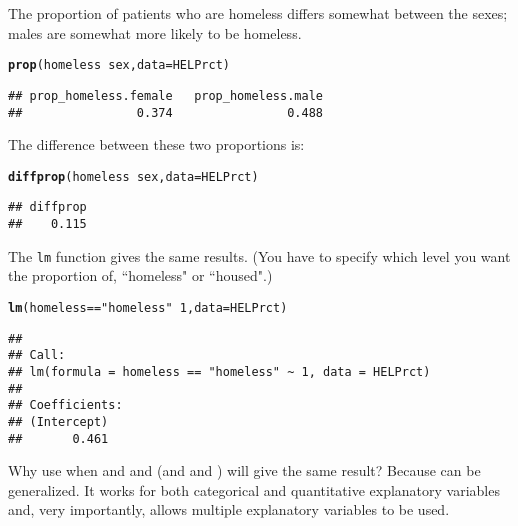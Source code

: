 \documentclass[11pt]{article}\usepackage[]{graphicx}\usepackage[]{color}
\makeatletter
\newcommand{\hlnum}[1]{\textcolor[rgb]{0.686,0.059,0.569}{#1}}%
\newcommand{\hlstr}[1]{\textcolor[rgb]{0.192,0.494,0.8}{#1}}%
\newcommand{\hlopt}[1]{\textcolor[rgb]{0,0,0}{#1}}%
\newcommand{\hlstd}[1]{\textcolor[rgb]{0.345,0.345,0.345}{#1}}%
\newcommand{\hlkwc}[1]{\textcolor[rgb]{0.333,0.667,0.333}{#1}}%
\newcommand{\hlkwd}[1]{\textcolor[rgb]{0.737,0.353,0.396}{\textbf{#1}}}%
\newenvironment{kframe}{%
 \def\at@end@of@kframe{}%
 \ifinner\ifhmode%
  \def\at@end@of@kframe{\end{minipage}}%
  \begin{minipage}{\columnwidth}%
 \fi\fi%
 \def\FrameCommand##1{\hskip\@totalleftmargin \hskip-\fboxsep
 \colorbox{shadecolor}{##1}\hskip-\fboxsep
     \hskip-\linewidth \hskip-\@totalleftmargin \hskip\columnwidth}%
 \MakeFramed {\advance\hsize-\width
   \@totalleftmargin\z@ \linewidth\hsize
   \@setminipage}}%
 {\par\unskip\endMakeFramed%
 \at@end@of@kframe}
\newenvironment{knitrout}{}{} %
\makeatother
\begin{document}
The proportion of patients who are homeless differs somewhat between the sexes; males are somewhat more likely to be homeless.
\begin{knitrout}
\color{fgcolor}\begin{kframe}
\begin{alltt}
\hlkwd{prop}\hlstd{(homeless} \hlopt{~} \hlstd{sex,} \hlkwc{data} \hlstd{= HELPrct)}
\end{alltt}
\begin{verbatim}
## prop_homeless.female   prop_homeless.male 
##                0.374                0.488
\end{verbatim}
\end{kframe}
\end{knitrout}

The difference between these two proportions is:
\begin{knitrout}
\color{fgcolor}\begin{kframe}
\begin{alltt}
\hlkwd{diffprop}\hlstd{(homeless} \hlopt{~} \hlstd{sex,} \hlkwc{data} \hlstd{= HELPrct)}
\end{alltt}
\begin{verbatim}
## diffprop 
##    0.115
\end{verbatim}
\end{kframe}
\end{knitrout}

The \texttt{lm} function gives the same results. (You have to specify which level you want the proportion of, ``homeless" or ``housed".)
\begin{knitrout}
\color{fgcolor}\begin{kframe}
\begin{alltt}
\hlkwd{lm}\hlstd{(homeless}\hlopt{==}\hlstr{"homeless"} \hlopt{~} \hlnum{1}\hlstd{,} \hlkwc{data} \hlstd{= HELPrct)}
\end{alltt}
\begin{verbatim}
## 
## Call:
## lm(formula = homeless == "homeless" ~ 1, data = HELPrct)
## 
## Coefficients:
## (Intercept)  
##       0.461
\end{verbatim}
\end{kframe}
\end{knitrout}

Why use  when  and  and 
(and  and ) will give the same result?  
Because  can be generalized.  It works for both categorical and 
quantitative explanatory variables and, very importantly,  
allows multiple explanatory variables to be used.
\end{document}
